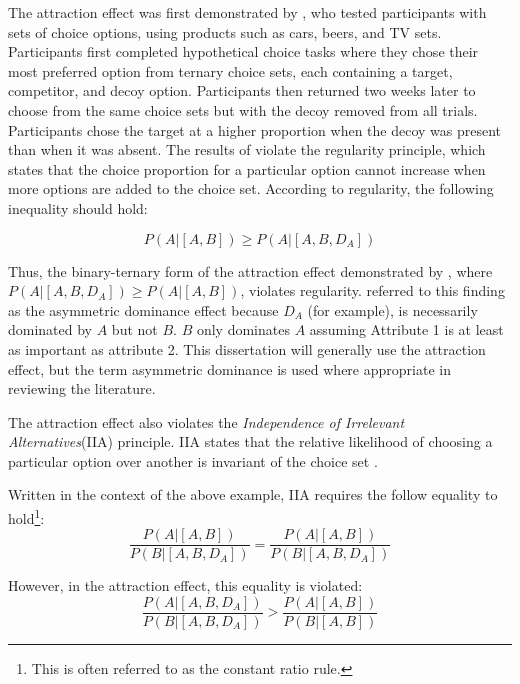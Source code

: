 The attraction effect was first demonstrated by \textcite{huberAddingAsymmetricallyDominated1982d}, who tested participants with sets of choice options, using products such as cars, beers, and TV sets. Participants first completed hypothetical choice tasks where they chose their most preferred option from ternary choice sets, each containing a target, competitor, and decoy option. Participants then returned two weeks later to choose from the same choice sets but with the decoy removed from all trials. Participants chose the target at a higher proportion when the decoy was present than when it was absent. The results of \textcite{huberAddingAsymmetricallyDominated1982d} violate the regularity principle, which states that the choice proportion for a particular option cannot increase when more options are added to the choice set. According to regularity, the following inequality should hold:

\begin{equation}
  P(A|[A,B])\geq P(A|[A,B,D_{A}])
  \label{eqn:reg_att}
\end{equation}

Thus, the binary-ternary form of the attraction effect demonstrated by \textcite{huberAddingAsymmetricallyDominated1982d}, where $P(A|[A,B,D_{A}])\geq P(A|[A,B])$, violates regularity. \textcite{huberAddingAsymmetricallyDominated1982d} referred to this finding as the asymmetric dominance effect because $D_{A}$ (for example), is necessarily dominated by $A$ but not $B$. $B$ only dominates $A$ assuming Attribute 1 is at least as important as attribute 2. This dissertation will generally use the attraction effect, but the term asymmetric dominance is used where appropriate in reviewing the literature.

The attraction effect also violates the \textit{Independence of Irrelevant Alternatives}(IIA) principle. IIA states that the relative likelihood of choosing a particular option over another is invariant of the choice set \parencite{ray1973independence}. 

Written in the context of the above example, IIA requires the follow equality to hold\footnote{This is often referred to as the constant ratio rule.}: 
\begin{equation}
  \frac{P(A|[A,B])}{P(B|[A,B,D_{A}])}=\frac{P(A|[A,B])}{P(B|[A,B,D_{A}])}
  \label{eqn:iia_att}
\end{equation}

However, in the attraction effect, this equality is violated:
\begin{equation}
  \frac{P(A|[A,B,D_{A}])}{P(B|[A,B,D_{A}])}>\frac{P(A|[A,B])}{P(B|[A,B])}
  \label{eqn:iia_att1}
\end{equation}

